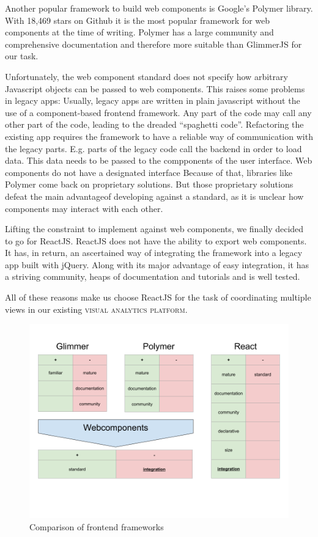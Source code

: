 \documentclass{article}
\newcommand{\visan}{\textsc{visual analytics platform}}
\begin{document}
Another popular framework to build web components is Google's Polymer library\cite{Polymer2017}.
With 18,469 stars on Github it is the most popular framework for web components at the time of writing.
Polymer has a large community and comprehensive documentation and therefore more suitable than GlimmerJS for our task.

Unfortunately, the web component standard does not specify how arbitrary Javascript objects can be passed to web components.
This raises some problems in legacy apps:
Usually, legacy apps are written in plain javascript without the use of a component-based frontend framework.
Any part of the code may call any other part of the code, leading to the dreaded ``spaghetti code''.
Refactoring the existing app requires the framework to have a reliable way of communication with the legacy parts. 
E.g. parts of the legacy code call the backend in order to load data.
This data needs to be passed to the compponents of the user interface.
Web components do not have a designated interface
Because of that, libraries like Polymer come back on proprietary solutions.
But those proprietary solutions defeat the main advantageof developing against a standard, as it is unclear how components may interact with each other.

Lifting the constraint to implement against web components, we finally decided to go for ReactJS\cite{React2017}.
ReactJS does not have the ability to export web components.
It has, in return, an ascertained way of integrating the framework into a legacy app built with jQuery.
Along with its major advantage of easy integration, it has a striving community, heaps of documentation and tutorials and is well tested.

All of these reasons make us choose ReactJS for the task of coordinating multiple views in our existing \visan{}.




\begin{figure}[h!]
  \centering
  \includegraphics[width=\textwidth]{images/frontend-frameworks.png}
  \caption{Comparison of frontend frameworks}
  \label{fig:implementation:frontend-frameworks}
\end{figure}
\end{document}
